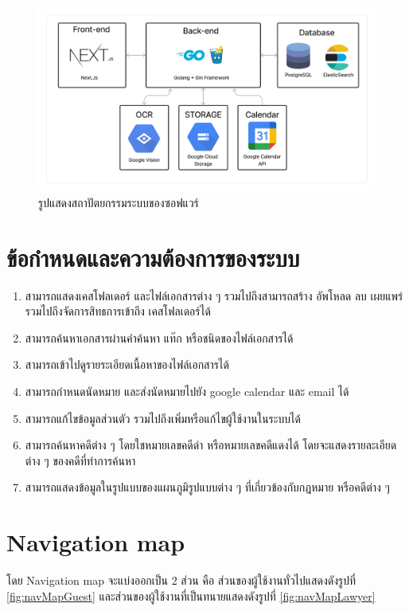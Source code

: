 \documentclass[12pt,oneside,openright,a4paper]{cpe-thai-project}
\begin{document}
\begin{figure}[!ht]\centering
  \includegraphics[width=13cm]{./assets/system-arch.png}
  \caption{รูปแสดงสถาปัตยกรรมระบบของซอฟแวร์}\label{fig:systemArch}
\end{figure}

\newpage

\section{ข้อกำหนดและความต้องการของระบบ}
\begin{enumerate}
  \item สามารถแสดงเคสโฟลเดอร์ และไฟล์เอกสารต่าง ๆ รวมไปถึงสามารถสร้าง อัพโหลด ลบ เผยแพร่ รวมไปถึงจัดการสิทธการเข้าถึง เคสโฟลเดอร์ได้
  \item สามารถค้นหาเอกสารผ่านคำค้นหา แท๊ก หรือชนิดของไฟล์เอกสารได้
  \item สามารถเข้าไปดูรายระเอียดเนื้อหาของไฟล์เอกสารได้
  \item สามารถกำหนดนัดหมาย และส่งนัดหมายไปยัง google calendar และ email ได้
  \item สามารถแก้ไขข้อมูลส่วนตัว รวมไปถึงเพิ่มหรือแก้ไขผู้ใช้งานในระบบได้
  \item สามารถค้นหาคดีต่าง ๆ โดยใชหมายเลขคดีดำ หรือหมายเลขคดีแดงได้ โดยจะแสดงรายละเอียดต่าง ๆ ของคดีที่ทำการค้นหา
  \item สามารถแสดงข้อมูลในรูปแบบของแผนภูมิรูปแบบต่าง ๆ ที่เกี่ยวข้องกับกฎหมาย หรือคดีต่าง ๆ
\end{enumerate}

\clearpage
\section{Navigation map}
\hspace*{1cm}โดย Navigation map จะแบ่งออกเป็น 2 ส่วน คือ ส่วนของผู้ใช้งานทั่วไปแสดงดังรูปที่ \ref{fig:navMapGuest} และส่วนของผู้ใช้งานที่เป็นทนายแสดงดังรูปที่ \ref{fig:navMapLawyer} \\
\end{document}
